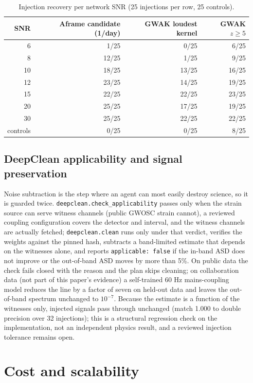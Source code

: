 \documentclass[twocolumn]{aastex631}
\begin{document}
\begin{table}
\centering
\caption{Injection recovery per network SNR (25 injections per row, 25
controls).}
\label{tab:injections}
\begin{tabular}{rrrr}
\toprule
SNR & Aframe candidate (1/day) & GWAK loudest kernel & GWAK $z\geq5$ \\
\midrule
6 & 1/25 & 0/25 & 6/25 \\
8 & 12/25 & 1/25 & 9/25 \\
10 & 18/25 & 13/25 & 16/25 \\
12 & 23/25 & 14/25 & 19/25 \\
15 & 22/25 & 22/25 & 23/25 \\
20 & 25/25 & 17/25 & 19/25 \\
30 & 25/25 & 22/25 & 22/25 \\
controls & 0/25 & 0/25 & 8/25 \\
\bottomrule
\end{tabular}
\end{table}

\subsection{DeepClean applicability and signal preservation}
Noise subtraction is the step where an agent can most easily destroy
science, so it is guarded twice. \texttt{deepclean.check\_applicability}
passes only when the strain source can serve witness channels (public
GWOSC strain cannot), a reviewed coupling configuration covers the
detector and interval, and the witness channels are actually fetched;
\texttt{deepclean.clean} runs only under that verdict, verifies the
weights against the pinned hash, subtracts a band-limited estimate that
depends on the witnesses alone, and reports \texttt{applicable: false} if
the in-band ASD does not improve or the out-of-band ASD moves by more than
5\%. On public data the check fails closed with the reason and the plan
skips cleaning; on collaboration data (not part of this paper's evidence)
a self-trained 60 Hz mains-coupling model reduces the line by a factor of
seven on held-out data and leaves the out-of-band spectrum unchanged to
$10^{-7}$. Because the estimate is a function of the witnesses only,
injected signals pass through unchanged (match 1.000 to double precision
over 32 injections); this is a structural regression check on the
implementation, not an independent physics result, and a reviewed
injection tolerance remains open.

\section{Cost and scalability}
\label{sec:cost}
\end{document}
